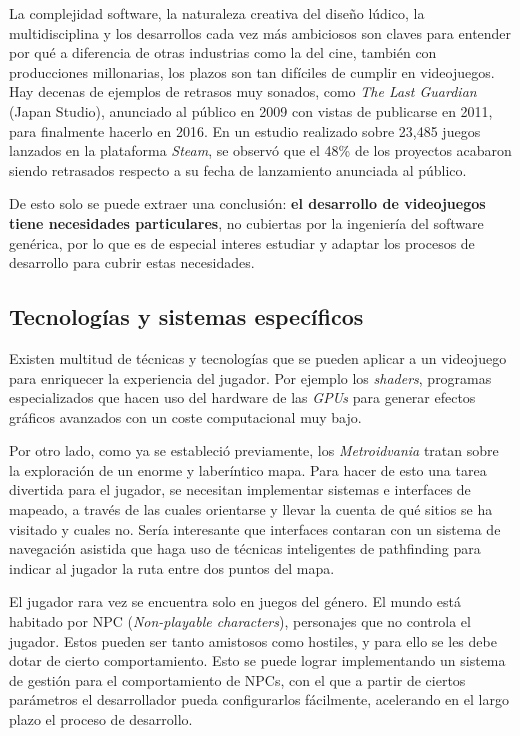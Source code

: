 La complejidad software, la naturaleza creativa del diseño lúdico, la multidisciplina y los desarrollos cada vez más ambiciosos son claves para entender por qué a diferencia de otras industrias como la del cine, también con producciones millonarias, los plazos son tan difíciles de cumplir en videojuegos. Hay decenas de ejemplos de retrasos muy sonados, como \textit{The Last Guardian} (Japan Studio), anunciado al público en 2009 con vistas de publicarse en 2011, para finalmente hacerlo en 2016. En un estudio\cite{delayed-games-study} realizado sobre 23,485 juegos lanzados en la plataforma \textit{Steam}, se observó que el 48\% de los proyectos acabaron siendo retrasados respecto a su fecha de lanzamiento anunciada al público.

De esto solo se puede extraer una conclusión: \textbf{el desarrollo de videojuegos tiene necesidades particulares}, no cubiertas por la ingeniería del software genérica, por lo que es de especial interes estudiar y adaptar los procesos de desarrollo para cubrir estas necesidades.

\subsection{Tecnologías y sistemas específicos}

Existen multitud de técnicas y tecnologías que se pueden aplicar a un videojuego para enriquecer la experiencia del jugador. Por ejemplo los \textit{shaders}, programas especializados que hacen uso del hardware de las \textit{GPUs} para generar efectos gráficos avanzados con un coste computacional muy bajo.

Por otro lado, como ya se estableció previamente, los \textit{Metroidvania} tratan sobre la exploración de un enorme y laberíntico mapa. Para hacer de esto una tarea divertida para el jugador, se necesitan implementar sistemas e interfaces de mapeado, a través de las cuales orientarse y llevar la cuenta de qué sitios se ha visitado y cuales no. Sería interesante que interfaces contaran con un sistema de navegación asistida que haga uso de técnicas inteligentes de pathfinding para indicar al jugador la ruta entre dos puntos del mapa.

El jugador rara vez se encuentra solo en juegos del género. El mundo está habitado por NPC (\textit{Non-playable characters}), personajes que no controla el jugador. Estos pueden ser tanto amistosos como hostiles, y para ello se les debe dotar de cierto comportamiento. Esto se puede lograr implementando un sistema de gestión para el comportamiento de NPCs, con el que a partir de ciertos parámetros el desarrollador pueda configurarlos fácilmente, acelerando en el largo plazo el proceso de desarrollo.


